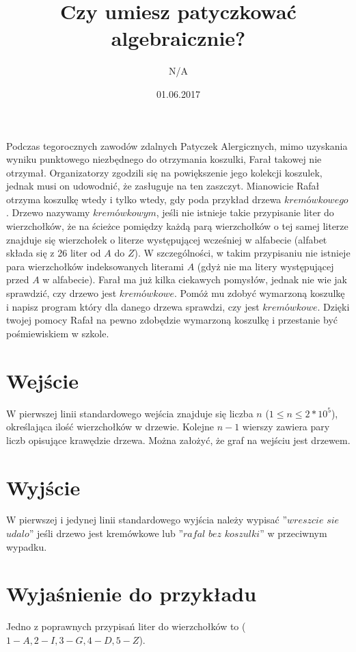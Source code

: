 \documentclass[zad,zawodnik,utf8]{sinol}
\title{Czy umiesz patyczkować algebraicznie?}
\author{N/A} %
\date{01.06.2017}
\begin{document}
\begin{tasktext}

Podczas tegorocznych zawodów zdalnych Patyczek Alergicznych, mimo uzyskania wyniku punktowego niezbędnego do otrzymania koszulki, Farał takowej nie otrzymał. Organizatorzy zgodzili się na powiększenie jego kolekcji koszulek, jednak musi on udowodnić, że zasługuje na ten zaszczyt.
 Mianowicie Rafał otrzyma koszulkę wtedy  i tylko wtedy, gdy poda przykład drzewa $kremówkowego$. Drzewo nazywamy $kremówkowym$, jeśli  nie istnieje takie przypisanie liter do wierzchołków, że na ścieżce pomiędzy każdą parą wierzchołków o tej samej literze znajduje się wierzchołek o literze występującej wcześniej w alfabecie (alfabet składa się z 26 liter od $A$ do $Z$).  W szczególności, w takim przypisaniu nie istnieje para wierzchołków indeksowanych literami $A$ (gdyż nie ma litery występującej przed $A$ w alfabecie). Farał ma już kilka ciekawych pomysłów, jednak nie wie jak sprawdzić, czy drzewo jest $kremówkowe$. Pomóż mu zdobyć wymarzoną koszulkę i napisz program który dla danego drzewa sprawdzi, czy jest $kremówkowe$. Dzięki twojej pomocy Rafał na pewno zdobędzie wymarzoną koszulkę i przestanie być pośmiewiskiem w szkole.

  \section{Wejście}
W pierwszej linii standardowego wejścia znajduje się liczba $n$ ($1 \leq n \leq 2*10^5$), określająca ilość wierzchołków w drzewie. Kolejne $n-1$ wierszy zawiera pary liczb opisujące krawędzie drzewa. Można założyć, że graf na wejściu jest drzewem.


	\section{Wyjście}
W pierwszej i jedynej linii standardowego wyjścia należy wypisać ''$wreszcie$ $sie$ $udalo$'' jeśli drzewo jest kremówkowe lub ''$rafal$ $bez$ $koszulki$''  w przeciwnym wypadku.
	\makecompactexample


	\section{Wyjaśnienie do przykładu}
	Jedno z poprawnych przypisań liter do wierzchołków to ($1-A,2-I,3-G,4-D,5-Z$).
\end{tasktext}
\end{document}
